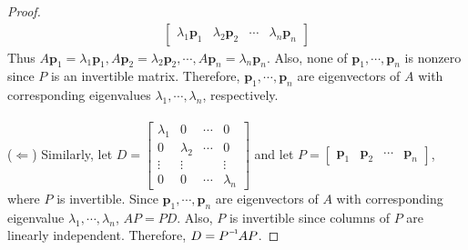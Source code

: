 \begin{proof}
\begin{align*}
\begin{bmatrix}
			\lambda_1\textbf{p}_1 & \lambda_2\textbf{p}_2 & \cdots & \lambda_n\textbf{p}_n
		\end{bmatrix}
	\end{align*}
	Thus $A\textbf{p}_1 = \lambda_1 \textbf{p}_1, A\textbf{p}_2 = \lambda_2 \textbf{p}_2, \cdots, A\textbf{p}_n = \lambda_n\textbf{p}_n$. Also, none of $\textbf{p}_1, \cdots, \textbf{p}_n$ is nonzero since $P$ is an invertible matrix. Therefore, $\textbf{p}_1, \cdots, \textbf{p}_n$ are eigenvectors of $A$ with corresponding eigenvalues $\lambda_1, \cdots, \lambda_n$, respectively. \\
	\\
	($\Leftarrow$) Similarly, let $D = \begin{bmatrix}
	\lambda_1 & 0 & \cdots & 0 \\
	0 & \lambda_2 & \cdots & 0 \\
	\vdots & \vdots & & \vdots \\
	0 & 0 & \cdots & \lambda_n
	\end{bmatrix}$ and let $P = \begin{bmatrix}
	\textbf{p}_1 & \textbf{p}_2 & \cdots & \textbf{p}_n
	\end{bmatrix}$, where $P$ is invertible. Since $\textbf{p}_1, \cdots, \textbf{p}_n$ are eigenvectors of $A$ with corresponding eigenvalue $\lambda_1, \cdots, \lambda_n$, $AP = PD$. Also, $P$ is invertible since columns of $P$ are linearly independent. Therefore, $D = \inv{P}AP$.
\end{proof}

